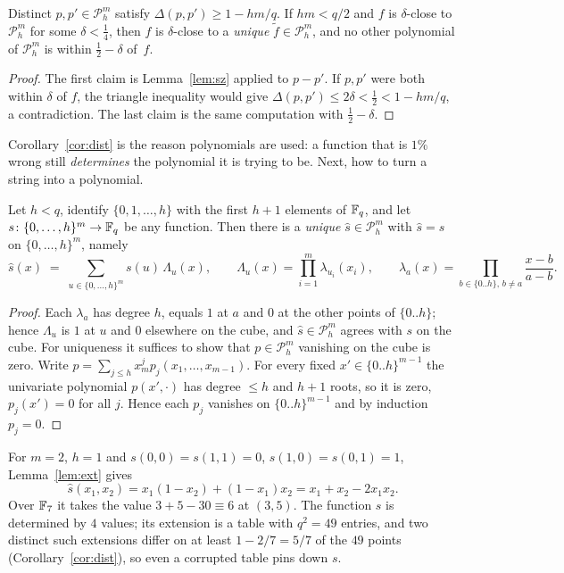 \begin{corollary}\label{cor:dist}
Distinct $p,p'\in\mathcal P^m_h$ satisfy $\Delta(p,p')\ge1-hm/q$.  If $hm<q/2$ and $f$ is $\delta$-close to $\mathcal P^m_h$ for some $\delta<\tfrac14$,
then $f$ is $\delta$-close to a \emph{unique} $\tilde f\in\mathcal P^m_h$, and no other polynomial of $\mathcal P_h^m$ is within $\tfrac12-\delta$ of~$f$.
\end{corollary}
\begin{proof}
The first claim is Lemma~\ref{lem:sz} applied to $p-p'$.  If $p,p'$ were both within $\delta$ of $f$, the triangle inequality would give
$\Delta(p,p')\le2\delta<\tfrac12<1-hm/q$, a contradiction.  The last claim is the same computation with $\tfrac12-\delta$.
\end{proof}

\noindent
Corollary~\ref{cor:dist} is the reason polynomials are used: a function that is $1\%$ wrong still \emph{determines} the polynomial it is trying to be.
Next, how to turn a string into a polynomial.

\begin{lemma}\label{lem:ext}
Let $h<q$, identify $\{0,1,\dots,h\}$ with the first $h+1$ elements of $\mathbb{F}_q$, and let $s\colon\{0,\dots,h\}^m\to\mathbb{F}_q$ be any function.  Then there is a \emph{unique}
$\hat s\in\mathcal P^m_h$ with $\hat s=s$ on $\{0,\dots,h\}^m$, namely
\[
  \hat s(x)\;=\;\sum_{u\in\{0,\dots,h\}^m}s(u)\,\Lambda_u(x),\qquad
  \Lambda_u(x)=\prod_{i=1}^m\lambda_{u_i}(x_i),\qquad
  \lambda_a(x)=\prod_{b\in\{0..h\},\,b\ne a}\frac{x-b}{a-b}.
\]
\end{lemma}
\begin{proof}
Each $\lambda_a$ has degree $h$, equals $1$ at $a$ and $0$ at the other points of $\{0..h\}$; hence $\Lambda_u$ is $1$ at $u$ and $0$
elsewhere on the cube, and $\hat s\in\mathcal P^m_h$ agrees with $s$ on the cube.  For uniqueness it suffices to show that $p\in\mathcal P^m_h$ vanishing on the cube is
zero.  Write $p=\sum_{j\le h}x_m^jp_j(x_1,\dots,x_{m-1})$.  For every fixed $x'\in\{0..h\}^{m-1}$ the univariate polynomial $p(x',\cdot)$ has degree $\le h$ and $h+1$ roots,
so it is zero, \ie $p_j(x')=0$ for all $j$.  Hence each $p_j$ vanishes on $\{0..h\}^{m-1}$ and by induction $p_j=0$.
\end{proof}

\begin{example}\label{ex:xor}
For $m=2$, $h=1$ and $s(0,0)=s(1,1)=0$, $s(1,0)=s(0,1)=1$, Lemma~\ref{lem:ext} gives
\[
  \hat s(x_1,x_2)=x_1(1-x_2)+(1-x_1)x_2=x_1+x_2-2x_1x_2 .
\]
Over $\mathbb{F}_7$ it takes the value $3+5-30\equiv6$ at $(3,5)$.  The function $s$ is determined by $4$ values; its extension is a table with $q^2=49$ entries, and two distinct such extensions differ on at least $1-2/7=5/7$ of the $49$ points
(Corollary~\ref{cor:dist}), so even a corrupted table pins down $s$.
\end{example}

